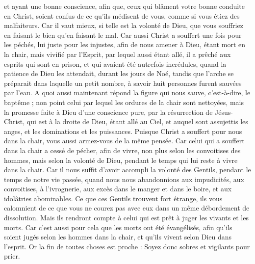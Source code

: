 \begin{multicols}{2}
et ayant une bonne conscience, afin que, ceux qui blâment votre bonne conduite en Christ, soient confus de ce qu'ils médisent de vous, comme si vous étiez des malfaiteurs.
Car il vaut mieux, si telle est la volonté de Dieu, que vous souffriez en faisant le bien qu’en faisant le mal.
Car aussi Christ a souffert une fois pour les péchés, lui juste pour les injustes, afin de nous amener à Dieu, étant mort en la chair, mais vivifié par l'Esprit,
par lequel aussi étant allé, il a  prêché aux esprits qui sont en prison,
et qui avaient été autrefois incrédules, quand la patience de Dieu les attendait, durant les jours de Noé, tandis que l'arche se préparait dans laquelle un petit nombre, à savoir huit personnes furent sauvées par l'eau.
A quoi aussi maintenant répond la figure qui nous sauve, c'est-à-dire, le baptême ; non point celui par lequel les ordures de la chair sont nettoyées, mais la promesse faite à Dieu d'une conscience pure, par la résurrection de Jésus-Christ,
qui est à la droite de Dieu, étant allé au Ciel, et auquel sont assujettis les anges, et les dominations et les puissances.
\VerseOne{}Puisque Christ a souffert pour nous dans la chair, vous aussi armez-vous de la même pensée. Car celui qui a souffert dans la chair a cessé de pécher,
afin de vivre, non plus selon les convoitises des hommes, mais selon la volonté de Dieu, pendant le temps qui lui reste à vivre dans la chair.
Car il nous suffit d'avoir accompli la volonté des Gentils, pendant le temps de notre vie passée, quand nous nous abandonnions aux impudicités, aux convoitises, à l'ivrognerie, aux excès dans le manger et dans le boire, et aux idolâtries abominables.
Ce que ces Gentils trouvent fort étrange, ils vous calomnient de ce que vous ne courez pas avec eux dans un même débordement de dissolution. 
Mais ils rendront compte à celui qui est prêt à juger les vivants et les morts.
Car c'est aussi pour cela que les morts ont été évangélisés, afin qu'ils soient jugés selon les hommes dans la chair, et qu'ils vivent selon Dieu dans l'esprit. 
Or la fin de toutes choses est proche : Soyez donc sobres et vigilants pour prier. 

\end{multicols}
